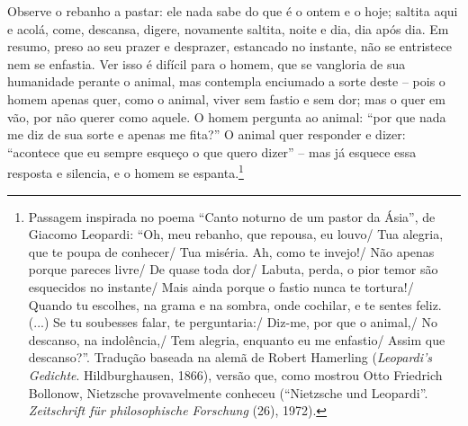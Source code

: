 Observe o rebanho a pastar: ele nada sabe do que é o ontem e o hoje;
saltita aqui e acolá, come, descansa, digere, novamente saltita, noite e
dia, dia após dia. Em resumo, preso ao seu prazer e desprazer, estancado
no instante, não se entristece nem se enfastia. Ver isso é difícil para
o homem, que se vangloria de sua humanidade perante o animal, mas
contempla enciumado a sorte deste -- pois o homem apenas quer, como o
animal, viver sem fastio e sem dor; mas o quer em vão, por não querer
como aquele. O homem pergunta ao animal: ``por que nada me diz de sua
sorte e apenas me fita?'' O animal quer responder e dizer: ``acontece que eu
sempre esqueço o que quero dizer'' -- mas já esquece essa resposta e
silencia, e o homem se espanta.\footnote{Passagem inspirada no poema
  ``Canto noturno de um pastor da Ásia'', de Giacomo Leopardi: ``Oh, meu
  rebanho, que repousa, eu louvo/ Tua alegria, que te poupa de
  conhecer/ Tua miséria. Ah, como te invejo!/ Não apenas porque pareces
  livre/ De quase toda dor/ Labuta, perda, o pior temor são esquecidos no
  instante/ Mais ainda porque o fastio nunca te tortura!/ Quando tu
  escolhes, na grama e na sombra, onde cochilar, e te sentes feliz.
  (...) Se tu soubesses falar, te perguntaria:/ Diz-me, por que o
  animal,/ No descanso, na indolência,/ Tem alegria, enquanto eu me
  enfastio/ Assim que descanso?''. Tradução baseada na alemã de
  Robert Hamerling (\emph{Leopardi's Gedichte}. Hildburghausen, 1866),
  versão que, como mostrou Otto Friedrich Bollonow, Nietz\-sche
  provavelmente conheceu (``Nietz\-sche und Leopardi''. \emph{Zeitschrift
  für philosophische Forschung} (26), 1972).}


